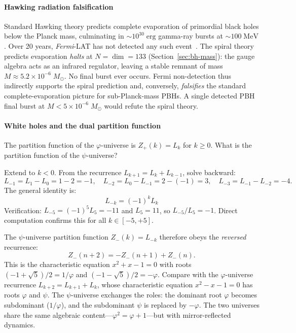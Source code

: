 \documentclass[12pt,a4paper]{article}
\begin{document}
\paragraph{Hawking radiation falsification}
Standard Hawking theory predicts complete evaporation of primordial black holes below the Planck mass, culminating in $\sim 10^{30}\;\mathrm{erg}$ gamma-ray bursts at $\sim 100\;\mathrm{MeV}$. Over 20 years, \emph{Fermi}-LAT has not detected any such event~\cite{FermiLAT}. The spiral theory predicts evaporation \emph{halts} at $N = \dim = 133$ (Section~\ref{sec:bh-mass}): the gauge algebra acts as an infrared regulator, leaving a stable remnant of mass $M \approx 5.2 \times 10^{-6}\;M_\odot$. No final burst ever occurs. Fermi non-detection thus indirectly supports the spiral prediction and, conversely, \emph{falsifies} the standard complete-evaporation picture for sub-Planck-mass PBHs. A single detected PBH final burst at $M < 5\times 10^{-6}\;M_\odot$ would refute the spiral theory.

\paragraph{White holes and the dual partition function}
\label{sec:white-holes}
\label{sec:bh-zero-d}

The partition function of the $\varphi$-universe is $Z_+(k) = L_k$ for $k \geq 0$. What is the partition function of the $\psi$-universe?

Extend to $k < 0$. From the recurrence $L_{k+1} = L_k + L_{k-1}$, solve backward:
\begin{equation}
L_{-1} = L_1 - L_0 = 1 - 2 = -1, \quad L_{-2} = L_0 - L_{-1} = 2 - (-1) = 3, \quad L_{-3} = L_{-1} - L_{-2} = -4.
\end{equation}
The general identity is:
\begin{equation}
\boxed{L_{-k} = (-1)^k L_k}
\end{equation}
Verification: $L_{-5} = (-1)^5 L_5 = -11$ and $L_5 = 11$, so $L_{-5}/L_5 = -1$. Direct computation confirms this for all $k \in [-5, +5]$.

The $\psi$-universe partition function $Z_-(k) = L_{-k}$ therefore obeys the \emph{reversed} recurrence:
\begin{equation}
Z_-(n+2) = -Z_-(n+1) + Z_-(n).
\end{equation}
This is the characteristic equation $x^2 + x - 1 = 0$ with roots $(-1 + \sqrt{5})/2 = 1/\varphi$ and $(-1 - \sqrt{5})/2 = -\varphi$. Compare with the $\varphi$-universe recurrence $L_{k+2} = L_{k+1} + L_k$, whose characteristic equation $x^2 - x - 1 = 0$ has roots $\varphi$ and $\psi$. The $\psi$-universe exchanges the roles: the dominant root $\varphi$ becomes subdominant ($1/\varphi$), and the subdominant $\psi$ is replaced by $-\varphi$. The two universes share the same algebraic content---$\varphi^2 = \varphi + 1$---but with mirror-reflected dynamics.
\end{document}
